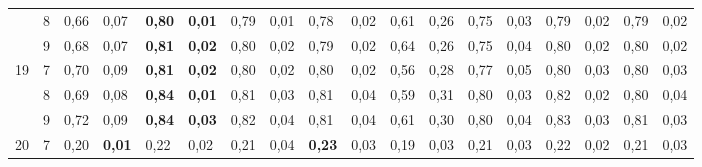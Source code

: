 \documentclass[conference]{IEEEtran}
\begin{document}
\begin{table}[]
\begin{tabular}{|cl|ll|ll|ll|ll|ll|ll|ll|ll|}
		\multicolumn{1}{|c|}{}                    & 8 & \multicolumn{1}{l|}{0,66} & 0,07          & \multicolumn{1}{l|}{\textbf{0,80}} & \textbf{0,01} & \multicolumn{1}{l|}{0,79}          & 0,01 & \multicolumn{1}{l|}{0,78}          & 0,02 & \multicolumn{1}{l|}{0,61}                 & 0,26 & \multicolumn{1}{l|}{0,75} & 0,03 & \multicolumn{1}{l|}{0,79}          & 0,02          & \multicolumn{1}{l|}{0,79}          & 0,02          \\ \cline{2-18} 
		\multicolumn{1}{|c|}{}                    & 9 & \multicolumn{1}{l|}{0,68} & 0,07          & \multicolumn{1}{l|}{\textbf{0,81}} & \textbf{0,02} & \multicolumn{1}{l|}{0,80}          & 0,02 & \multicolumn{1}{l|}{0,79}          & 0,02 & \multicolumn{1}{l|}{0,64}                 & 0,26 & \multicolumn{1}{l|}{0,75} & 0,04 & \multicolumn{1}{l|}{0,80}          & 0,02          & \multicolumn{1}{l|}{0,80}          & 0,02          \\ \hline
		\multicolumn{1}{|c|}{\multirow{3}{*}{19}} & 7 & \multicolumn{1}{l|}{0,70} & 0,09          & \multicolumn{1}{l|}{\textbf{0,81}} & \textbf{0,02} & \multicolumn{1}{l|}{0,80}          & 0,02 & \multicolumn{1}{l|}{0,80}          & 0,02 & \multicolumn{1}{l|}{0,56}                 & 0,28 & \multicolumn{1}{l|}{0,77} & 0,05 & \multicolumn{1}{l|}{0,80}          & 0,03          & \multicolumn{1}{l|}{0,80}          & 0,03          \\ \cline{2-18} 
		\multicolumn{1}{|c|}{}                    & 8 & \multicolumn{1}{l|}{0,69} & 0,08          & \multicolumn{1}{l|}{\textbf{0,84}} & \textbf{0,01} & \multicolumn{1}{l|}{0,81}          & 0,03 & \multicolumn{1}{l|}{0,81}          & 0,04 & \multicolumn{1}{l|}{0,59}                 & 0,31 & \multicolumn{1}{l|}{0,80} & 0,03 & \multicolumn{1}{l|}{0,82}          & 0,02          & \multicolumn{1}{l|}{0,80}          & 0,04          \\ \cline{2-18} 
		\multicolumn{1}{|c|}{}                    & 9 & \multicolumn{1}{l|}{0,72} & 0,09          & \multicolumn{1}{l|}{\textbf{0,84}} & \textbf{0,03} & \multicolumn{1}{l|}{0,82}          & 0,04 & \multicolumn{1}{l|}{0,81}          & 0,04 & \multicolumn{1}{l|}{0,61}                 & 0,30 & \multicolumn{1}{l|}{0,80} & 0,04 & \multicolumn{1}{l|}{0,83}          & 0,03          & \multicolumn{1}{l|}{0,81}          & 0,03          \\ \hline
		\multicolumn{1}{|c|}{\multirow{3}{*}{20}} & 7 & \multicolumn{1}{l|}{0,20} & \textbf{0,01} & \multicolumn{1}{l|}{0,22}          & 0,02          & \multicolumn{1}{l|}{0,21}          & 0,04 & \multicolumn{1}{l|}{\textbf{0,23}} & 0,03 & \multicolumn{1}{l|}{0,19}                 & 0,03 & \multicolumn{1}{l|}{0,21} & 0,03 & \multicolumn{1}{l|}{0,22}          & 0,02          & \multicolumn{1}{l|}{0,21}          & 0,03          \\ \cline{2-18} 

\end{tabular}
\end{table}
\end{document}
